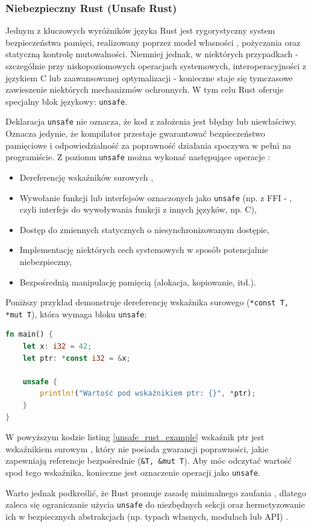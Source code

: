 \subsubsection{Niebezpieczny Rust (Unsafe Rust)}
Jednym z kluczowych wyróżników języka Rust jest rygorystyczny system bezpieczeństwa pamięci, realizowany poprzez model własności , pożyczania  oraz statyczną kontrolę mutowalności. Niemniej jednak, w niektórych przypadkach - szczególnie przy niskopoziomowych operacjach systemowych, interoperacyjności z językiem C lub zaawansowanej optymalizacji - konieczne staje się tymczasowe zawieszenie niektórych mechanizmów ochronnych. W tym celu Rust oferuje specjalny blok językowy: \texttt{unsafe}.

Deklaracja \texttt{unsafe} nie oznacza, że kod z założenia jest błędny lub niewłaściwy. Oznacza jedynie, że kompilator przestaje gwarantować bezpieczeństwo pamięciowe i odpowiedzialność za poprawność działania spoczywa w pełni na programiście. Z poziomu \texttt{unsafe} można wykonać następujące operacje \cite{UnsafeRust,TheRustProgrammingLanguage} :
\begin{itemize}
\item Dereferencję wskaźników surowych ,
\item Wywołanie funkcji lub interfejsów oznaczonych jako \texttt{unsafe} (np. z FFI - , czyli interfejs do wywoływania funkcji z innych języków, np. C),
\item Dostęp do zmiennych statycznych o niesynchronizowanym dostępie,
\item Implementację niektórych cech  systemowych w sposób potencjalnie niebezpieczny,
\item Bezpośrednią manipulację pamięcią (alokacja, kopiowanie, itd.).
\end{itemize} 
Poniższy przykład demonstruje dereferencję wskaźnika surowego (\texttt{*const T, *mut T}), która wymaga bloku \texttt{unsafe}:
\begin{lstlisting}[language=Rust, caption=Przykład użycia unsafe Rust, label=unsafe_rust_example]
fn main() {
    let x: i32 = 42;
    let ptr: *const i32 = &x;

    unsafe {
        println!("Wartość pod wskaźnikiem ptr: {}", *ptr);
    }
}
\end{lstlisting}
W powyższym kodzie listing \ref{unsafe_rust_example} wskaźnik ptr jest wskaźnikiem surowym , który nie posiada gwarancji poprawności, jakie zapewniają referencje bezpośrednie \mbox{(\texttt{\&T, \&mut T})}. Aby móc odczytać wartość spod tego wskaźnika, konieczne jest oznaczenie operacji jako \texttt{unsafe}.

Warto jednak podkreślić, że Rust promuje zasadę minimalnego zaufania , dlatego zaleca się ograniczanie użycia \texttt{unsafe} do niezbędnych sekcji oraz hermetyzowanie ich w bezpiecznych abstrakcjach (np. typach własnych, modułach lub API) \cite{UnsafeRust}.




